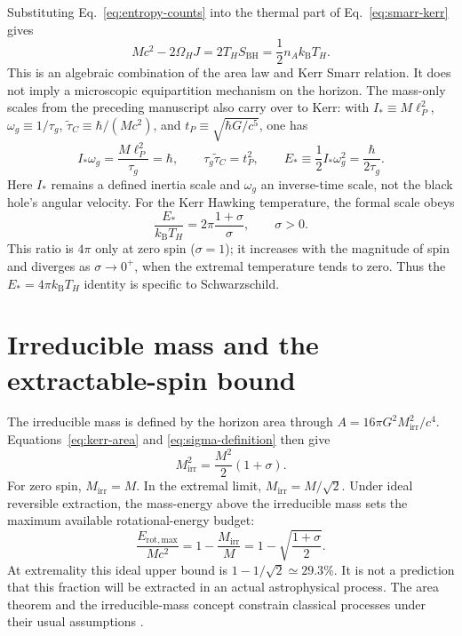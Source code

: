 \documentclass[12pt]{article}
\begin{document}
Substituting Eq.~\eqref{eq:entropy-counts} into the thermal part of Eq.~\eqref{eq:smarr-kerr} gives
\begin{equation}
  Mc^2-2\Omega_HJ
  =2T_HS_{\mathrm{BH}}
  =\frac{1}{2}n_Ak_{\mathrm B}T_H.
  \label{eq:area-smarr-link}
\end{equation}
This is an algebraic combination of the area law and Kerr Smarr relation. It does not imply a microscopic equipartition mechanism on the horizon. The mass-only scales from the preceding manuscript also carry over to Kerr: with $I_*\equiv M\ell_P^2$, $\omega_g\equiv1/\tau_g$, $\tilde{\tau}_C\equiv\hbar/(Mc^2)$, and $t_P\equiv\sqrt{\hbar G/c^5}$, one has
\begin{equation}
  I_*\omega_g=\frac{M\ell_P^2}{\tau_g}=\hbar,
  \qquad
  \tau_g\tilde{\tau}_C=t_P^2,
  \qquad
  E_*\equiv\frac{1}{2}I_*\omega_g^2=\frac{\hbar}{2\tau_g}.
  \label{eq:mass-only-scales}
\end{equation}
Here $I_*$ remains a defined inertia scale and $\omega_g$ an inverse-time scale, not the black hole's angular velocity. For the Kerr Hawking temperature, the formal scale obeys
\begin{equation}
  \frac{E_*}{k_{\mathrm B}T_H}=2\pi\frac{1+\sigma}{\sigma},
  \qquad \sigma>0.
  \label{eq:kerr-thermal-ratio}
\end{equation}
This ratio is $4\pi$ only at zero spin ($\sigma=1$); it increases with the magnitude of spin and diverges as $\sigma\to0^+$, when the extremal temperature tends to zero. Thus the $E_*=4\pi k_{\mathrm B}T_H$ identity is specific to Schwarzschild.

\section{Irreducible mass and the extractable-spin bound}

The irreducible mass is defined by the horizon area through $A=16\pi G^2M_{\mathrm{irr}}^2/c^4$. Equations~\eqref{eq:kerr-area} and \eqref{eq:sigma-definition} then give \cite{Christodoulou}
\begin{equation}
  M_{\mathrm{irr}}^2
  =\frac{M^2}{2}(1+\sigma).
  \label{eq:irreducible-mass}
\end{equation}
For zero spin, $M_{\mathrm{irr}}=M$. In the extremal limit, $M_{\mathrm{irr}}=M/\sqrt{2}$. Under ideal reversible extraction, the mass-energy above the irreducible mass sets the maximum available rotational-energy budget:
\begin{equation}
  \frac{E_{\mathrm{rot,max}}}{Mc^2}
  =1-\frac{M_{\mathrm{irr}}}{M}
  =1-\sqrt{\frac{1+\sigma}{2}}.
  \label{eq:extractable-energy}
\end{equation}
At extremality this ideal upper bound is $1-1/\sqrt{2}\simeq29.3\%$. It is not a prediction that this fraction will be extracted in an actual astrophysical process. The area theorem and the irreducible-mass concept constrain classical processes under their usual assumptions \cite{BardeenCarterHawking,Christodoulou}.
\end{document}
